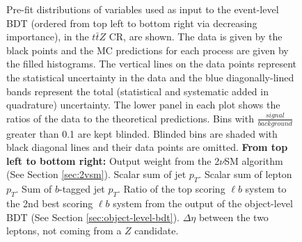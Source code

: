 \begin{figure}[htbp]
\caption{Pre-fit distributions of variables used as input to the event-level BDT (ordered from top left to bottom right via decreasing importance), in the $t\bar{t}Z$ CR, are shown. The data is given by the black points and the MC predictions for each process are given by the filled histograms. The vertical lines on the data points represent the statistical uncertainty in the data and the blue diagonally-lined bands represent the total (statistical and systematic added in quadrature) uncertainty. The lower panel in each plot shows the ratios of the data to the theoretical predictions. Bins with $\frac{signal}{background}$ greater than 0.1 are kept blinded. Blinded bins are shaded with black diagonal lines and their data points are omitted. \textbf{From top left to bottom right:} Output weight from the 2$\nu$SM algorithm (See Section \ref{sec:2vsm}). Scalar sum of jet $p_{T}$. Scalar sum of lepton $p_{T}$. Sum of $b$-tagged jet $p_{T}$. Ratio of the top scoring $\ell b$ system to the 2nd best scoring $\ell b$ system from the output of the object-level BDT (See Section \ref{sec:object-level-bdt}). $\Delta \eta$ between the two leptons, not coming from a $Z$ candidate.}
  \label{fig:4lep-ttZCR-eventbdt-vars}
\end{figure}



